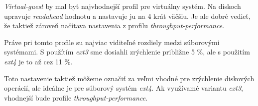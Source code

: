 \emph{Virtual-guest} by mal byť najvhodnejší profil pre virtuálny systém. Na
diskoch upravuje \emph{readahead} hodnotu a nastavuje ju na 4 krát väčšiu. Je
ale dobré vedieť, že taktiež zároveň načítava nastavenia z profilu
\emph{throughput-performance}.

Práve pri tomto profile su najviac viditeľné rozdiely medzi súborovými
systémami. S použítím \emph{ext3} sme dosiahli zrýchlenie približne 5 \%, ale s
použitím \emph{ext4} je to až cez 11 \%.

Toto nastavenie taktiež môžeme označiť za veľmi vhodné pre zrýchlenie diskových
operácií, ale ideálne je pre súborový systém \emph{ext4}. Ak využívamé variantu
\emph{ext3}, vhodnejší bude profile \emph{throughput-performance}.
